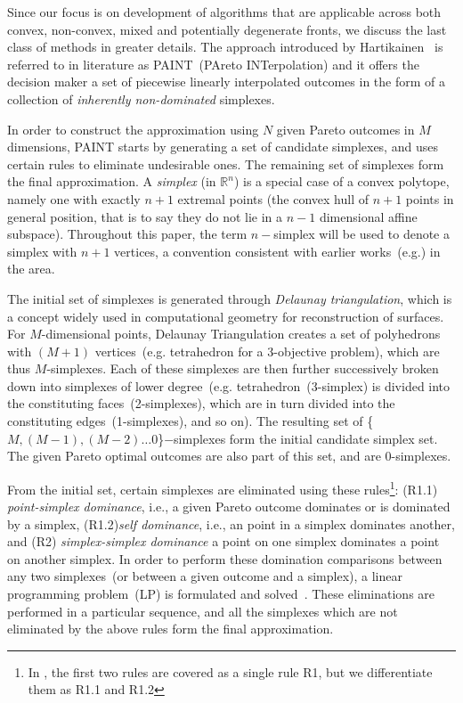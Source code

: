 {\color{blue}
	Since our focus is on development of algorithms that are applicable across both convex, non-convex, mixed and potentially degenerate fronts, we discuss the last class of methods in greater details. The approach introduced by Hartikainen~\cite{hartikainen2012paint,hartikainen2014paint} is referred to in literature as PAINT~(PAreto INTerpolation) and it offers the decision maker a set of piecewise linearly interpolated outcomes in the form of a collection of \emph{inherently non-dominated} simplexes. 
	
	In order to construct the approximation using $N$ given Pareto outcomes in $M$ dimensions, PAINT starts by generating a set of candidate simplexes, and uses certain rules to eliminate undesirable ones. The remaining set of simplexes form the final approximation. A \emph{simplex} (in $\mathbb{R}^n$) is a special case of a convex polytope, namely one with exactly $n+1$ extremal points (the convex hull of $n+1$ points in general position, that is to say they do not lie in a $n-1$ dimensional affine subspace). Throughout this paper, the term $n-$simplex will be used to denote a simplex with $n+1$ vertices, a convention consistent with earlier works~(e.g.\cite{hartikainen2012paint}) in the area.
	
	The initial set of simplexes is generated through \textit{Delaunay triangulation}, which is a concept widely used in computational geometry for reconstruction of surfaces. For $M$-dimensional points, Delaunay Triangulation creates a set of polyhedrons with $(M+1)$ vertices~(e.g. tetrahedron for a 3-objective problem), which are thus $M$-simplexes. Each of these simplexes are then further successively broken down into simplexes of lower degree~(e.g. tetrahedron~(3-simplex) is divided into the constituting faces~(2-simplexes), which are in turn divided into the constituting edges~(1-simplexes), and so on). The resulting set of \{$M,(M-1),(M-2) \ldots 0$\}$-$simplexes form the initial candidate simplex set. The given Pareto optimal outcomes are also part of this set, and are 0-simplexes. 
	
	From the initial set, certain simplexes are eliminated using these rules\footnote{In \cite{hartikainen2012paint}, the first two rules are covered as a single rule R1, but we differentiate them as R1.1 and R1.2}: (R1.1) \emph{point-simplex dominance}, i.e., a given Pareto outcome dominates or is dominated by a simplex, (R1.2)\textit{self dominance}, i.e., an point in a simplex dominates another, and (R2) \textit{simplex-simplex dominance} a point on one simplex dominates a point on another simplex. {\color{blue}In order to perform these domination comparisons between any two simplexes~(or between a given outcome and a simplex), a linear programming problem~(LP) is formulated and solved~\cite{hartikainen2012paint}}. These eliminations are performed in a particular sequence, and all the simplexes which are not eliminated by the above rules form the final approximation.  
	
}
